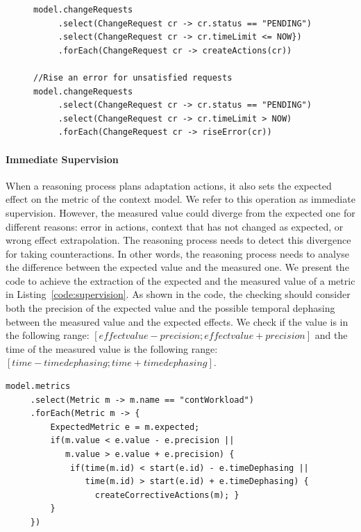 \begin{figure}
\begin{lstlisting}[style=customc,caption=Generation of the DAG of actions from the change requested,label=code:ansewring-requests,basicstyle=\scriptsize]
model.changeRequests
     .select(ChangeRequest cr -> cr.status == "PENDING")
     .select(ChangeRequest cr -> cr.timeLimit <= NOW})
     .forEach(ChangeRequest cr -> createActions(cr))
 
//Rise an error for unsatisfied requests
model.changeRequests
     .select(ChangeRequest cr -> cr.status == "PENDING")
     .select(ChangeRequest cr -> cr.timeLimit > NOW)
     .forEach(ChangeRequest cr -> riseError(cr))
\end{lstlisting}
\end{figure}


\paragraph{Immediate Supervision}

When a reasoning process plans adaptation actions, it also sets the expected effect on the metric of the context model. 
We refer to this operation as immediate supervision. 
However, the measured value could diverge from the expected one for different reasons: error in actions, context that has not changed as expected, or wrong effect extrapolation.
The reasoning process needs to detect this divergence for taking counteractions.
In other words, the reasoning process needs to analyse the difference between the expected value and the measured one.
We present the code to achieve the extraction of the expected and the measured value of a metric in Listing~\ref{code:supervision}.
As shown in the code, the checking should consider both the precision of the expected value and the possible temporal dephasing between the measured value and the expected effects. 
We check if the value is in the following range:  $[effect value - precision ; effect value + precision]$ and the time of the measured value is the following range: $[time - time dephasing; time + time dephasing]$.

\begin{lstlisting}[style=customc,caption=Detection of difference between measured and expected values, label=code:supervision, basicstyle=\scriptsize]
model.metrics
     .select(Metric m -> m.name == "contWorkload")
     .forEach(Metric m -> { 
     	 ExpectedMetric e = m.expected;
     	 if(m.value < e.value - e.precision || 
     	    m.value > e.value + e.precision) {
     	     if(time(m.id) < start(e.id) - e.timeDephasing || 
     	        time(m.id) > start(e.id) + e.timeDephasing) {
     	          createCorrectiveActions(m); }
         }
     })
\end{lstlisting}


